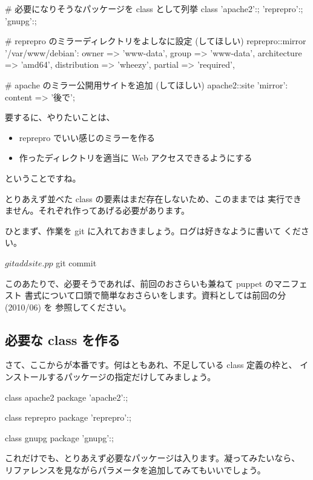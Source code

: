 \documentclass[mingoth,a4paper]{jsarticle}
\begin{document}
\begin{commandline}
# 必要になりそうなパッケージを class として列挙
class {
  'apache2':;
  'reprepro':;
  'gnupg':;
}

# reprepro のミラーディレクトリをよしなに設定 (してほしい)
reprepro::mirror { '/var/www/debian':
  owner => 'www-data', group => 'www-data',
  architecture => 'amd64',
  distribution => 'wheezy',
  partial => 'required',
}

# apache のミラー公開用サイトを追加 (してほしい)
apache2::site {
  'mirror':
    content => '後で';
}
\end{commandline}

要するに、やりたいことは、

\begin{itemize}
\item reprepro でいい感じのミラーを作る
\item 作ったディレクトリを適当に Web アクセスできるようにする
\end{itemize}

ということですね。

とりあえず並べた class の要素はまだ存在しないため、このままでは
実行できません。それぞれ作ってあげる必要があります。

ひとまず、作業を git に入れておきましょう。ログは好きなように書いて
ください。

\begin{commandline}
$ git add site.pp
$ git commit
\end{commandline}

このあたりで、必要そうであれば、前回のおさらいも兼ねて puppet のマニフェスト
書式について口頭で簡単なおさらいをします。資料としては前回の分 (2010/06) を
参照してください。

\subsection{必要な class を作る}

さて、ここからが本番です。何はともあれ、不足している class 定義の枠と、
インストールするパッケージの指定だけしてみましょう。

\begin{commandline}
class apache2 {
  package { 'apache2':; }
}

class reprepro {
  package { 'reprepro':; }
}

class gnupg {
  package { 'gnupg':; }
}
\end{commandline}

これだけでも、とりあえず必要なパッケージは入ります。凝ってみたいなら、
リファレンスを見ながらパラメータを追加してみてもいいでしょう。
\end{document}

